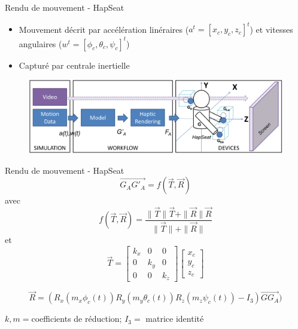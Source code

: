 \documentclass[compress, noflama]{beamer}
\begin{document}
{
\begin{frame}{Rendu de mouvement - HapSeat}
\begin{itemize}
\item Mouvement décrit par accélération linéraires ($a^t = [x_c,y_c,z_c]^t$) et vitesses angulaires ($w^t = [\phi_c, \theta_c, \psi_c]^t$)
\item Capturé par centrale inertielle
\end{itemize}
\begin{figure}
\centering
\includegraphics[width=\linewidth]{images/workflow}
\end{figure}
\end{frame}
}

\begin{frame}{Rendu de mouvement - HapSeat}
 \begin{equation}
 \overrightarrow{G_AG'_A} = f(\vec{T},\vec{R})
 \end{equation}
 avec
 \begin{equation}
f(\vec{T},\vec{R}) = \frac{\|\vec{T}\|\vec{T} + \|\vec{R}\|\vec{R}}{\|\vec{T}\| + \|\vec{R}\|}
\end{equation}
et
\begin{equation}
\vec{T} = \begin{bmatrix}
k_x & 0 & 0 \\
0 & k_y & 0 \\
0 & 0 & k_z
\end{bmatrix}
\begin{bmatrix}
x_c\\
y_c\\
z_c
\end{bmatrix} 
\label{eq:T}
\end{equation}
 

\begin{equation}
\vec{R} = (R_x(m_x \phi_c(t)) R_y(m_y \theta_c(t)) R_z(m_z \psi_c(t)) - I_3)\overrightarrow{GG_A})
\end{equation}

$k,m =$coefficients de réduction; $I_3 =$ matrice identité

\end{frame}
\end{document}

